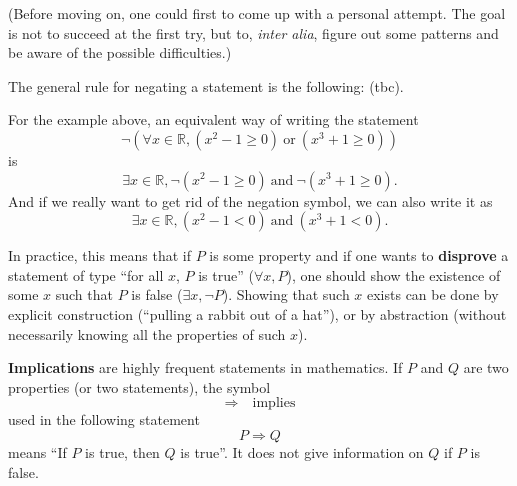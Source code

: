 \documentclass[
	fontsize=10pt, %
	twoside=true, %
	secnumdepth=1, %
	numbers=noenddot, %
]{kaobook}
\begin{document}
(Before moving on, one could first to come up with a personal attempt. The goal is not to succeed at the first try, but to, \emph{inter alia}, figure out some patterns and be aware of the possible difficulties.)

The general rule for negating a statement is the following: (tbc).

For the example above, an equivalent way of writing the statement
\begin{equation*}
\neg \left(\forall x\in\mathbb{R}, (x^2-1\geq 0)~\text{or}~(x^3+1\geq 0)\right)
\end{equation*}
is
\begin{equation*}
\exists x\in\mathbb{R}, \neg(x^2-1\geq 0)~\text{and}~\neg(x^3+1\geq 0).
\end{equation*}
And if we really want to get rid of the negation symbol, we can also write it as
\begin{equation*}
\exists x\in\mathbb{R}, (x^2-1<0)~\text{and}~(x^3+1<0).
\end{equation*}

\begin{remark}
In practice, this means that if $P$ is some property and if one wants to \textbf{disprove} a statement of type  ``for all $x$, $P$ is true'' ($\forall x, P$), one should show the existence of some $x$ such that $P$ is false ($\exists x, \neg P$). Showing that such $x$ exists can be done by explicit construction (``pulling a rabbit out of a hat''), or by abstraction (without necessarily knowing all the properties of such $x$).
\end{remark}

\textbf{Implications} are highly frequent statements in mathematics. If $P$ and $Q$ are two properties (or two statements), the symbol
\begin{equation*}
\Rightarrow\quad\text{implies}
\end{equation*}
used in the following statement
\begin{equation*}
P\Rightarrow Q
\end{equation*}
means ``If $P$ is true, then $Q$ is true''. It does not give information on $Q$ if $P$ is false.
\end{document}

